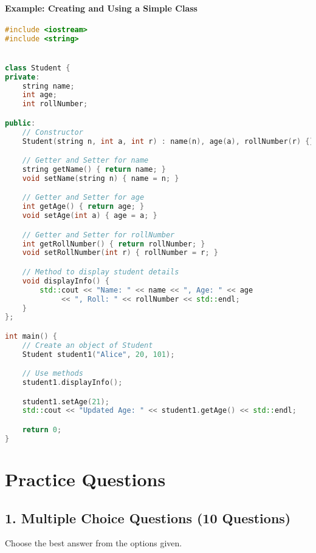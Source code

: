 \documentclass[a4paper,12pt]{article}
\begin{document}
\paragraph{Example: Creating and Using a Simple Class}
\begin{lstlisting}[language=C++]
#include <iostream>
#include <string>


class Student {
private:
    string name;
    int age;
    int rollNumber;

public:
    // Constructor
    Student(string n, int a, int r) : name(n), age(a), rollNumber(r) {}

    // Getter and Setter for name
    string getName() { return name; }
    void setName(string n) { name = n; }

    // Getter and Setter for age
    int getAge() { return age; }
    void setAge(int a) { age = a; }

    // Getter and Setter for rollNumber
    int getRollNumber() { return rollNumber; }
    void setRollNumber(int r) { rollNumber = r; }

    // Method to display student details
    void displayInfo() {
        std::cout << "Name: " << name << ", Age: " << age 
             << ", Roll: " << rollNumber << std::endl;
    }
};

int main() {
    // Create an object of Student
    Student student1("Alice", 20, 101);

    // Use methods
    student1.displayInfo();

    student1.setAge(21);
    std::cout << "Updated Age: " << student1.getAge() << std::endl;

    return 0;
}
\end{lstlisting}

\newpage
\section{Practice Questions}

\subsection{1. Multiple Choice Questions (10 Questions)}
Choose the best answer from the options given.
\end{document}
